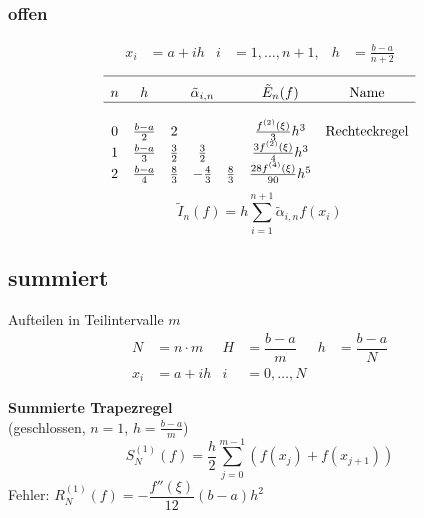 \documentclass[
ngerman,
accentcolor=9c,%
type=intern,
marginpar=false
]{tudapub}
\begin{document}
            \subsubsection{offen}
                \begin{align*}
                    x_i &= a+ih &  i&=1,\dots,n+1, &  h&=\frac{b-a}{n+2}
                \end{align*}
                \begin{equation*}
                    \begin{array}{c c c c c c c}
                        \hline\\[-.5\normalbaselineskip]
                        n & h & \multicolumn{3}{c}{\tilde{\alpha}_{i,n}} & \tilde{E}_n (f) & \text{Name}\\
                        \hline\\
                        0 & \frac{b-a}{2} & 2 & & & \frac{f^{(2)}(\xi)}{3}h^3 & \text{Rechteckregel}\\
                        1 & \frac{b-a}{3} & \frac{3}{2} & \frac{3}{2} & & \frac{3f^{(2)}(\xi)}{4}h^3 & \\
                        2 & \frac{b-a}{4} & \frac{8}{3} & -\frac{4}{3} & \frac{8}{3} & \frac{28f^{(4)}(\xi)}{90}h^5 & \\
                    \end{array}
                \end{equation*}
                \begin{equation*}
                    \tilde{I}_n(f) = h \sum^{n+1}_{i=1} \tilde{\alpha}_{i,n} f(x_i)
                \end{equation*}
        \subsection{summiert}
            Aufteilen in Teilintervalle $m$
            \begin{align*}
                N &= n \cdot m & H&= \dfrac{b-a}{m} & h&= \dfrac{b-a}{N}\\
                x_i &=  a + ih & i&= 0,\dots, N
            \end{align*}

            \textbf{Summierte Trapezregel}\\
            (geschlossen, $n=1$, $h  = \frac{b-a}{m}$)
            \begin{equation*}
                S^{(1)}_N(f) = \dfrac{h}{2} \sum_{j=0}^{m-1}(f(x_j) + f(x_{j+1}))
            \end{equation*}
            Fehler: $R^{(1)}_N(f)=-\dfrac{f''(\xi)}{12}(b-a)h^2$\\[2ex]
\end{document}
